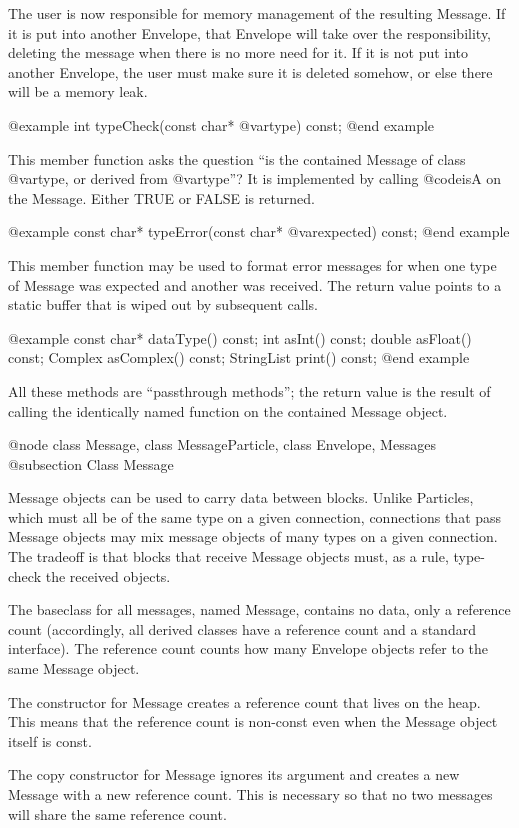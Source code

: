 The user is now responsible for memory management of the resulting
Message.  If it is put into another Envelope, that Envelope will
take over the responsibility, deleting the message when there is
no more need for it.  If it is not put into another Envelope, the
user must make sure it is deleted somehow, or else there will be
a memory leak.

@example
int typeCheck(const char* @var{type}) const;
@end example

This member function asks the question ``is the contained Message
of class @var{type}, or derived from @var{type}''?  It is implemented by
calling @code{isA} on the Message.  Either TRUE or FALSE is returned.

@example
const char* typeError(const char* @var{expected}) const;
@end example

This member function may be used to format error messages for when
one type of Message was expected and another was received.  The
return value points to a static buffer that is wiped out by subsequent
calls.

@example
const char* dataType() const;
int asInt() const;
double asFloat() const;
Complex asComplex() const;
StringList print() const;
@end example

All these methods are ``passthrough methods''; the return value is the
result of calling the identically named function on the contained
Message object.

@node class Message, class MessageParticle, class Envelope, Messages
@subsection Class Message

Message objects can be used to carry data between blocks.  Unlike
Particles, which must all be of the same type on a given connection,
connections that pass Message objects may mix message objects of
many types on a given connection.  The tradeoff is that blocks that
receive Message objects must, as a rule, type-check the received
objects.

The baseclass for all messages, named Message, contains no data, only
a reference count (accordingly, all derived classes have a reference
count and a standard interface).  The reference count counts how many
Envelope objects refer to the same Message object.

The constructor for Message creates a reference count that lives on
the heap.  This means that the reference count is non-const even when
the Message object itself is const.

The copy constructor for Message ignores its argument and creates a
new Message with a new reference count.  This is necessary so that no
two messages will share the same reference count.

